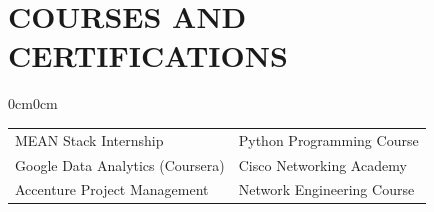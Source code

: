 \documentclass[10pt, letterpaper]{article}
\newenvironment{onecolentry}{
    \begin{adjustwidth}{0cm}{0cm}
}{
    \end{adjustwidth}
}
\begin{document}
    \section{COURSES AND CERTIFICATIONS}
    \begin{onecolentry}
        \begin{tabularx}{\linewidth}{X X}
            MEAN Stack Internship & Python Programming Course \\
            Google Data Analytics (Coursera) & Cisco Networking Academy \\
            Accenture Project Management & Network Engineering Course \\
        \end{tabularx}
    \end{onecolentry}

\end{document}
